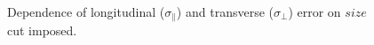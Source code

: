 \begin{figure}[p]
\centerline{}
\caption{\label{FIG::APPELLIPT::ERRORVSSIZE} Dependence of longitudinal
($\sigma_\parallel$) and transverse ($\sigma_\perp$) error on $size$
cut imposed. }
\end{figure}
